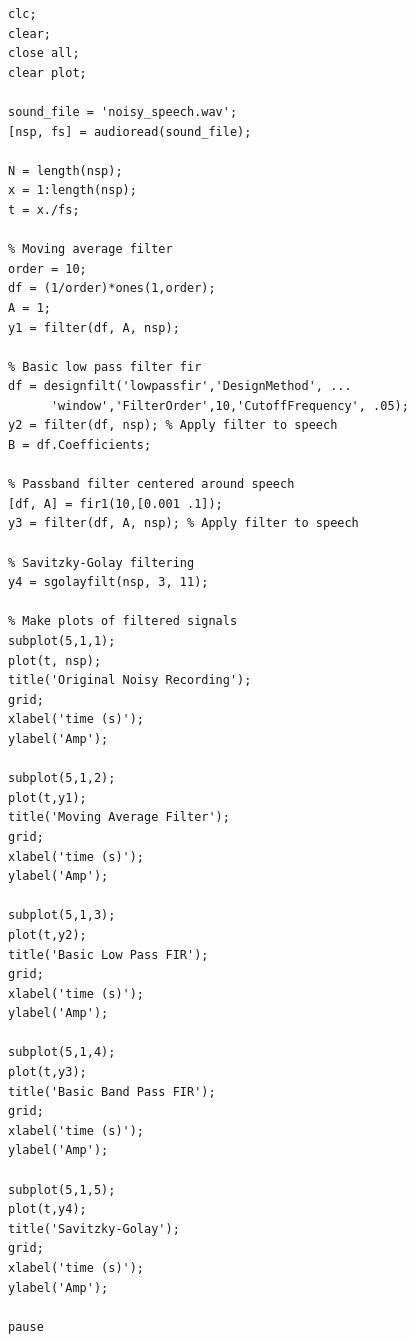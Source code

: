\documentclass[11pt]{article}
\begin{document}
\begin{lstlisting}
clc;
clear;
close all;
clear plot;

sound_file = 'noisy_speech.wav';
[nsp, fs] = audioread(sound_file);

N = length(nsp);
x = 1:length(nsp);
t = x./fs;

% Moving average filter
order = 10;
df = (1/order)*ones(1,order);
A = 1;
y1 = filter(df, A, nsp);

% Basic low pass filter fir
df = designfilt('lowpassfir','DesignMethod', ...
      'window','FilterOrder',10,'CutoffFrequency', .05);
y2 = filter(df, nsp); % Apply filter to speech
B = df.Coefficients;

% Passband filter centered around speech 
[df, A] = fir1(10,[0.001 .1]);
y3 = filter(df, A, nsp); % Apply filter to speech

% Savitzky-Golay filtering
y4 = sgolayfilt(nsp, 3, 11);

% Make plots of filtered signals
subplot(5,1,1);
plot(t, nsp);
title('Original Noisy Recording');
grid;
xlabel('time (s)');
ylabel('Amp');

subplot(5,1,2);
plot(t,y1);
title('Moving Average Filter');
grid;
xlabel('time (s)');
ylabel('Amp');

subplot(5,1,3);
plot(t,y2);
title('Basic Low Pass FIR');
grid;
xlabel('time (s)');
ylabel('Amp');

subplot(5,1,4);
plot(t,y3);
title('Basic Band Pass FIR');
grid;
xlabel('time (s)');
ylabel('Amp');

subplot(5,1,5);
plot(t,y4);
title('Savitzky-Golay');
grid;
xlabel('time (s)');
ylabel('Amp');

pause
\end{lstlisting}
\end{document}
